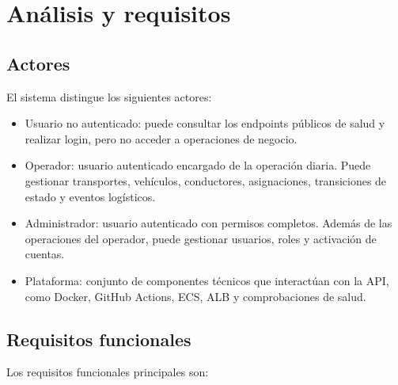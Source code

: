 \chapter{Análisis y requisitos}
\label{chap:requisitos}

\section{Actores}
\label{sec:actores}

El sistema distingue los siguientes actores:

\begin{itemize}
  \item Usuario no autenticado: puede consultar los endpoints públicos de salud y realizar login, pero no acceder a operaciones de negocio.
  \item Operador: usuario autenticado encargado de la operación diaria. Puede gestionar transportes, vehículos, conductores, asignaciones, transiciones de estado y eventos logísticos.
  \item Administrador: usuario autenticado con permisos completos. Además de las operaciones del operador, puede gestionar usuarios, roles y activación de cuentas.
  \item Plataforma: conjunto de componentes técnicos que interactúan con la API, como Docker, GitHub Actions, ECS, ALB y comprobaciones de salud.
\end{itemize}

\section{Requisitos funcionales}
\label{sec:requisitos-funcionales}

Los requisitos funcionales principales son:

